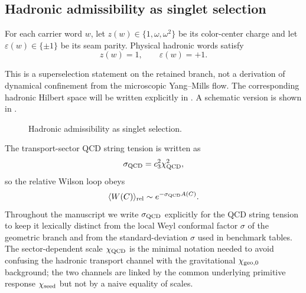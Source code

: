 \subsection{Hadronic admissibility as singlet selection}

\begin{proposition}
For each carrier word $w$, let $z(w)\in\{1,\omega,\omega^2\}$ be its color-center charge and let $\varepsilon(w)\in\{\pm1\}$ be its seam parity. Physical hadronic words satisfy
\[
z(w)=1,
\qquad
\varepsilon(w)=+1.
\]
\end{proposition}

This is a superselection statement on the retained branch, not a derivation of dynamical confinement from the microscopic Yang--Mills flow. The corresponding hadronic Hilbert space will be written explicitly in . A schematic version is shown in .

\begin{figure}[t]
\centering
{}
\caption{Hadronic admissibility as singlet selection.}
\label{fig:admissible-words}
\end{figure}

The transport-sector QCD string tension is written as
\[
\sigma_{\mathrm{QCD}}=c_3^2\chi_{\mathrm{QCD}}^2,
\]
so the relative Wilson loop obeys
\[
\langle W(C)\rangle_{\mathrm{rel}}\sim e^{-\sigma_{\mathrm{QCD}} A(C)}.
\]
Throughout the manuscript we write $\sigma_{\mathrm{QCD}}$ explicitly for the QCD string tension to keep
it lexically distinct from the local Weyl conformal factor $\sigma$ of the geometric branch and
from the standard-deviation $\sigma$ used in benchmark tables. The sector-dependent scale
$\chi_{\mathrm{QCD}}$ is the minimal notation needed to avoid confusing the hadronic transport channel
with the gravitational $\chi_{\mathrm{geo},0}$ background; the two channels are linked by the common
underlying primitive response $\chi_{\mathrm{seed}}$ but not by a naive equality of scales.

